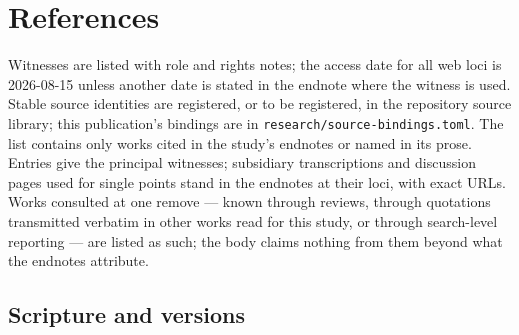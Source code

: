 \sectionguard
\section{References}

Witnesses are listed with role and rights notes; the access date for all
web loci is 2026-08-15 unless another date is stated in the endnote where
the witness is used. Stable source identities are registered, or to be
registered, in the repository source library; this publication's bindings
are in \texttt{research/source-bindings.toml}. The list contains only
works cited in the study's endnotes or named in its prose. Entries give
the principal witnesses; subsidiary transcriptions and discussion pages
used for single points stand in the endnotes at their loci, with exact
URLs. Works consulted at one remove --- known through reviews, through
quotations transmitted verbatim in other works read for this study, or
through search-level reporting --- are listed as such; the body claims
nothing from them beyond what the endnotes attribute.

\subsection*{Scripture and versions}

